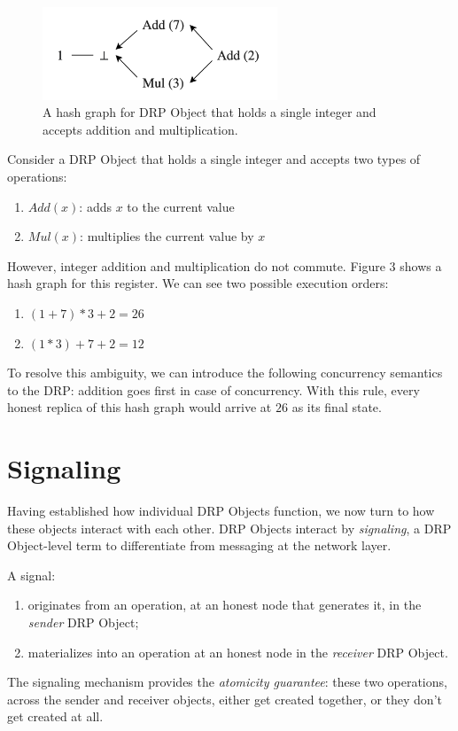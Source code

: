 \documentclass{article}
\begin{document}
\begin{figure}[htp]
    \centering
    \includegraphics[width=7cm]{fig3}
    \caption{A hash graph for DRP Object that holds a single integer and accepts addition and multiplication.}
    \label{fig:3}
\end{figure}

Consider a DRP Object that holds a single integer and accepts two types of operations:
\begin{enumerate}
    \item $Add(x)$: adds $x$ to the current value
    \item $Mul(x)$: multiplies the current value by $x$
\end{enumerate}

However, integer addition and multiplication do not commute. Figure 3 shows a hash graph for this register. We can see two possible execution orders:
\begin{enumerate}
    \item $(1+7)*3+2 = 26$
    \item $(1*3)+7+2 = 12$
\end{enumerate}

To resolve this ambiguity, we can introduce the following concurrency semantics to the DRP: addition goes first in case of concurrency. With this rule, every honest replica of this hash graph would arrive at $26$ as its final state.

\section{Signaling}
\label{sec:headings}

Having established how individual DRP Objects function, we now turn to how these objects interact with each other. DRP Objects interact by \textit{signaling}, a DRP Object-level term to differentiate from messaging at the network layer.

A signal:
\begin{enumerate}
    \item originates from an operation, at an honest node that generates it, in the \textit{sender} DRP Object;
    \item materializes into an operation at an honest node in the \textit{receiver} DRP Object.
\end{enumerate}
The signaling mechanism provides the \textit{atomicity guarantee}: these two operations, across the sender and receiver objects, either get created together, or they don't get created at all.
\end{document}
